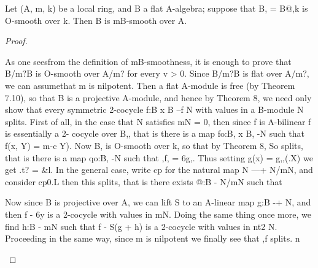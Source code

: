 \begin{theorem}[Theorem 28.10]\label{mcrt-auto-theorem-28-10}
\begin{mathematicalrecord}
Let (A, m, k) be a local ring, and B a flat A-algebra; suppose
that B, = B@,k is O-smooth over k. Then B is mB-smooth over A.
\end{mathematicalrecord}
\end{theorem}
\begin{proof}
\begin{mathematicalrecord}
As one seesfrom the definition of mB-smoothness, it is enough to
prove that B/m?B is O-smooth over A/m? for every v > 0. Since B/m?B is
flat over A/m?, we can assumethat m is nilpotent. Then a flat A-module
is free (by Theorem 7.10), so that B is a projective A-module, and hence
by Theorem 8, we need only show that every symmetric 2-cocycle
f:B x B --f N with values in a B-module N splits. First of all, in the case
that N satisfies mN = 0, then since f is A-bilinear f is essentially a 2-
cocycle over B,, that is there is a map fo:B, x B, -N                such that
f(x, Y) = m-c Y).
   Now B, is O-smooth over k, so that by Theorem 8, So splits, that is
there is a map qo:B, -N           such that ,f, = 6g,. Thus setting g(x) = g,,(.X)
     we get
              .t? = &l.
     In the general case, write cp for the natural map N ---+ N/mN, and consider
     cp0.L then this splits, that is there exists @:B - N/mN such that


     Now since B is projective over A, we can lift S to an A-linear map g:B -+ N,
     and then f - 6y is a 2-cocycle with values in mN. Doing the same thing
     once more, we find h:B - mN such that f - S(g + h) is a 2-cocycle with
     values in nt2 N. Proceeding in the same way, since m is nilpotent we finally
     see that ,f splits.  n
\end{mathematicalrecord}
\end{proof}



